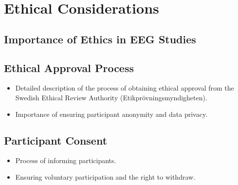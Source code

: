 \chapter{\rm\bfseries Ethical Considerations}
\label{ch:chapter03}

\section{Importance of Ethics in EEG Studies}

\section{Ethical Approval Process}
\begin{itemize}
    \item Detailed description of the process of obtaining ethical approval from the Swedish Ethical Review Authority (Etikprövningsmyndigheten).
    \item Importance of ensuring participant anonymity and data privacy.
\end{itemize}

\section{Participant Consent}
\begin{itemize}
    \item Process of informing participants.
    \item Ensuring voluntary participation and the right to withdraw.
\end{itemize}

